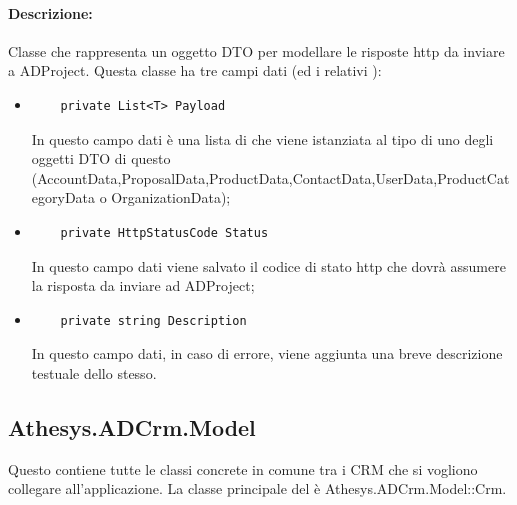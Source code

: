\paragraph{Descrizione:}
Classe che rappresenta un oggetto DTO per modellare le risposte http da inviare a ADProject.
Questa classe ha tre campi dati (ed i relativi ):
\begin{itemize}
	\item 	
	\begin{lstlisting}
	private List<T> Payload
	\end{lstlisting}
	In questo campo dati è una lista di  che viene istanziata al tipo di uno degli oggetti DTO di questo  (AccountData,ProposalData,ProductData,ContactData,UserData,ProductCategoryData o OrganizationData);
	
	\item 	
	\begin{lstlisting}
	private HttpStatusCode Status
	\end{lstlisting}
	In questo campo dati viene salvato il codice di stato http che dovrà assumere la risposta da inviare ad ADProject;
	
	\item
	\begin{lstlisting}
	private string Description
	\end{lstlisting}
	In questo campo dati, in caso di errore, viene aggiunta una breve descrizione testuale dello stesso.
\end{itemize}




\subsection{Athesys.ADCrm.Model}
Questo  contiene tutte le classi concrete in comune tra i CRM che si vogliono collegare all'applicazione.
La classe principale del  è Athesys.ADCrm.Model::Crm.
